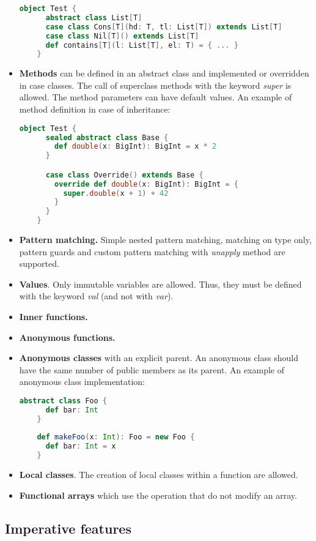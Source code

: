 \begin{itemize}
  \begin{lstlisting}[language=Scala]
    object Test {
      abstract class List[T]
      case class Cons[T](hd: T, tl: List[T]) extends List[T]
      case class Nil[T]() extends List[T]
      def contains[T](l: List[T], el: T) = { ... }
    }
  \end{lstlisting}
  \item \textbf{Methods} can be defined in an abstract class and implemented or overridden in case classes. 
  The call of superclass methods with the keyword \textit{super} is allowed. 
  The method parameters can have default values. 
  An example of method definition in case of inheritance:
  \begin{lstlisting}[language=Scala]
    object Test {
      sealed abstract class Base {
        def double(x: BigInt): BigInt = x * 2
      }

      case class Override() extends Base {
        override def double(x: BigInt): BigInt = {
          super.double(x + 1) + 42
        }
      }
    }
  \end{lstlisting}
  \item \textbf{Pattern matching.} 
  Simple nested pattern matching, matching on type only, pattern guards and custom pattern matching with \textit{unapply} method are supported.
  \item \textbf{Values}. 
  Only immutable variables are allowed. Thus, they must be defined with the keyword \textit{val} (and not with \textit{var}).
  \item \textbf{Inner functions.}
  \item \textbf{Anonymous functions.}
  \item \textbf{Anonymous classes} with an explicit parent. 
  An anonymous class should have the same number of public members as its parent.
  An example of anonymous class implementation:
  \begin{lstlisting}[language=Scala]
    abstract class Foo {
      def bar: Int
    }
    
    def makeFoo(x: Int): Foo = new Foo {
      def bar: Int = x
    }
  \end{lstlisting}
  \item \textbf{Local classes}. 
  The creation of local classes within a function are allowed. \cite{Stainless:pure_scala}
  \item \textbf{Functional arrays} which use the operation that do not modify an array.
\end{itemize}


\subsection{Imperative features}


